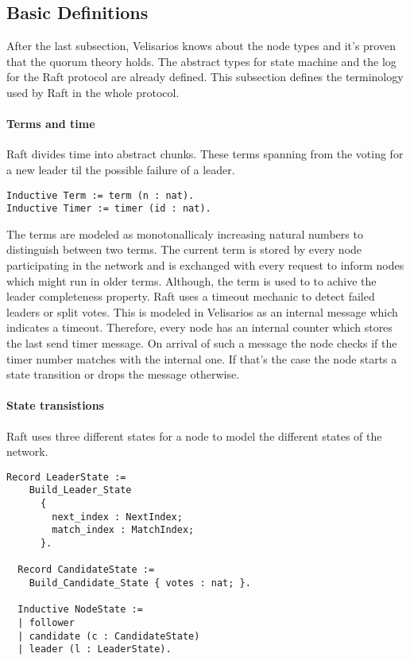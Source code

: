 

\subsection{Basic Definitions}
After the last subsection, Velisarios knows about the node types and it's proven
that the quorum theory holds. The abstract types for state machine and the log
for the Raft protocol are already defined. This subsection defines the
terminology used by Raft in the whole protocol.

\paragraph{Terms and time}
Raft divides time into abstract chunks. These terms spanning from the
voting for a new leader til the possible failure of a leader.

\begin{lstlisting}[style=coq,label=lst:terms,
caption=The definition of terms and timer.]
Inductive Term := term (n : nat).
Inductive Timer := timer (id : nat).
\end{lstlisting}

The terms are modeled as monotonallicaly increasing natural numbers to
distinguish between two terms. The current term is stored by every node
participating in the network and is exchanged with every request to
inform nodes which might run in older terms. Although, the term is used
to to achive the leader completeness property.
Raft uses a timeout mechanic to detect failed leaders or split
votes. This is modeled in Velisarios as an internal message which
indicates a timeout. Therefore, every node has an internal counter
which stores the last send timer message. On arrival of such a message
the node checks if the timer number matches with the internal one. If
that's the case the node starts a state transition or drops the message
otherwise.

\paragraph{State transistions}
Raft uses three different states for a node to model
the different states of the network.

\begin{lstlisting}[style=coq,label=lst:states,caption=The definition of the nodes states.]
 Record LeaderState :=
    Build_Leader_State
      {
        next_index : NextIndex;
        match_index : MatchIndex;
      }.

  Record CandidateState :=
    Build_Candidate_State { votes : nat; }.

  Inductive NodeState :=
  | follower
  | candidate (c : CandidateState)
  | leader (l : LeaderState).
\end{lstlisting}


